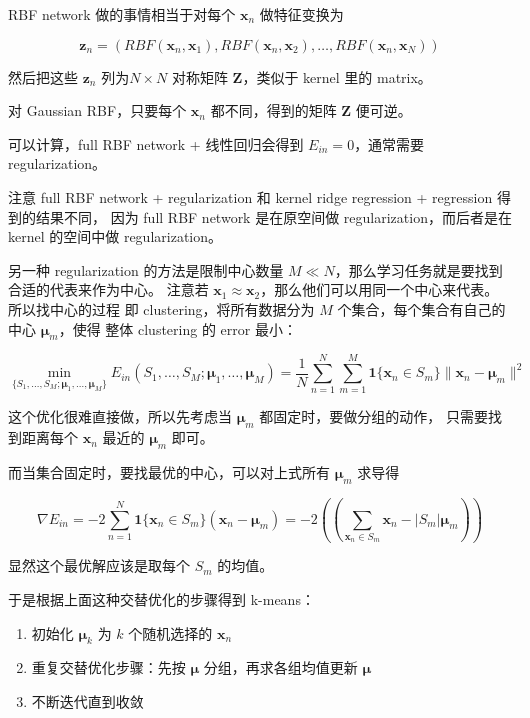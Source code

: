 \documentclass[a4paper]{article}
\begin{document}
RBF network 做的事情相当于对每个 $\mathbf{x}_n$ 做特征变换为

$$\mathbf{z}_n = (RBF(\mathbf{x}_n, \mathbf{x}_1), RBF(\mathbf{x}_n, \mathbf{x}_2), \dots, RBF(\mathbf{x}_n, \mathbf{x}_N))$$

然后把这些 $\mathbf{z}_n$ 列为$N\times N$ 对称矩阵 $\mathbf{Z}$，类似于 kernel 里的 matrix。

对 Gaussian RBF，只要每个 $\mathbf{x}_n$ 都不同，得到的矩阵 $\mathbf{Z}$ 便可逆。

可以计算，full RBF network + 线性回归会得到 $E_{in}=0$，通常需要 regularization。

注意 full RBF network + regularization 和 kernel ridge regression + regression 得到的结果不同，
因为 full RBF network 是在原空间做 regularization，而后者是在 kernel 的空间中做 regularization。

另一种 regularization 的方法是限制中心数量 $M \ll N$，那么学习任务就是要找到合适的代表来作为中心。
注意若 $\mathbf{x}_1 \approx \mathbf{x}_2$，那么他们可以用同一个中心来代表。所以找中心的过程
即 clustering，将所有数据分为 $M$ 个集合，每个集合有自己的中心 $\bm{\mu}_m$，使得
整体 clustering 的 error 最小：

$$\operatorname*{min}_{\{S_1,\dots,S_M;\bm{\mu}_1,\dots,\bm{\mu}_M\}} E_{in}(S_1, \dots, S_M; \bm{\mu}_1, \dots, \bm{\mu}_M) = \frac{1}{N}\sum_{n=1}^{N}\sum_{m=1}^{M}\mathbf{1}\{\mathbf{x}_n \in S_m\}\|\mathbf{x}_n-\bm{\mu}_m\|^2$$

这个优化很难直接做，所以先考虑当 $\bm{\mu}_m$ 都固定时，要做分组的动作，
只需要找到距离每个 $\mathbf{x}_n$ 最近的 $\bm{\mu}_m$ 即可。

而当集合固定时，要找最优的中心，可以对上式所有 $\bm{\mu}_m$ 求导得

$$\nabla E_{in} = -2\sum_{n=1}^{N}\mathbf{1}\{\mathbf{x}_n \in S_m\}(\mathbf{x}_n - \bm{\mu}_m) = -2\left ( \left ( \sum_{\mathbf{x}_n \in S_m}\mathbf{x}_n  - |S_m|\bm{\mu}_m\right ) \right )$$

显然这个最优解应该是取每个 $S_m$ 的均值。

于是根据上面这种交替优化的步骤得到 k-means：

\begin{enumerate}
  \item 初始化 $\bm{\mu}_k$ 为 $k$ 个随机选择的 $\mathbf{x}_n$ \\
  \item 重复交替优化步骤：先按 $\bm{\mu}$ 分组，再求各组均值更新 $\bm{\mu}$\\
  \item 不断迭代直到收敛\\
\end{enumerate}
\end{document}
